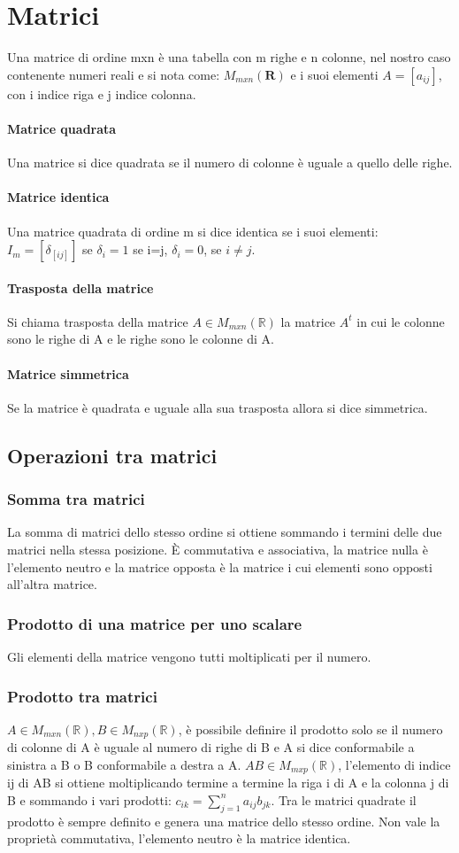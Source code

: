 \chapter{Matrici}
Una matrice di ordine mxn \`e una tabella con m righe e n colonne, nel nostro caso contenente numeri reali e si nota come: $M_{mxn} (\mathbf{R})$ e i suoi elementi
$A=[a_{ij}]$, con i indice riga e j indice colonna.
\subsubsection{Matrice quadrata}
Una matrice si dice quadrata se il numero di colonne \`e uguale a quello delle righe.
\subsubsection{Matrice identica}
 Una matrice quadrata di ordine m si dice identica se i suoi elementi: 
$I_m=[\delta_{[ij]}]$ se $\delta_i=1$ se i=j, $\delta_i=0$, se $i\neq j$.
\subsubsection{Trasposta della matrice}
Si chiama trasposta della matrice $A\in M_{mxn}(\mathbb{R})$ la matrice $A^t$ in cui le colonne sono le righe di A e le righe sono le colonne di A.
\subsubsection{Matrice simmetrica}
Se la matrice \`e quadrata e uguale alla sua trasposta allora si dice simmetrica. 
\section{Operazioni tra matrici}
\subsection{Somma tra matrici}
La somma di matrici dello stesso ordine si ottiene sommando i termini delle due matrici nella stessa posizione. \`E commutativa e associativa, la matrice nulla \`e 
l'elemento neutro e la matrice opposta \`e la matrice i cui elementi sono opposti all'altra matrice. 
\subsection{Prodotto di una matrice per uno scalare}
Gli elementi della matrice vengono tutti moltiplicati per il numero.
\subsection{Prodotto tra matrici}
$A\in M_{mxn} (\mathbb{R}), B\in M_{nxp} (\mathbb{R})$, \`e possibile definire il prodotto solo se il numero di colonne di A \`e uguale al numero di righe di B e A si dice 
conformabile a sinistra a B o B conformabile a destra a A. $AB\in M_{mxp} (\mathbb{R})$, l'elemento di indice ij di AB si ottiene moltiplicando termine a termine la riga i 
di A e la colonna j di B e sommando i vari prodotti: $c_{ik}=\sum\limits_{j=1}^n a_{ij}b_{jk}$. Tra le matrici quadrate il prodotto \`e sempre definito e genera una matrice 
dello stesso ordine. Non vale la propriet\`a commutativa, l'elemento neutro \`e la matrice identica. 
